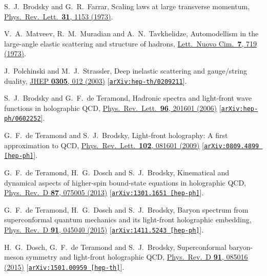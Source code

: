 \documentclass[aps,prd,preprint,groupedaddress]{revtex4-1}
\begin{document}
\begin{thebibliography}{99}
  S.~J.~Brodsky and G.~R.~Farrar,
 Scaling laws at large transverse momentum,
 \href{http://prl.aps.org/abstract/PRL/v31/i18/p1153_1}{ Phys.\ Rev.\ Lett.\  {\bf 31}, 1153 (1973)}.


  V.~A.~Matveev, R.~M.~Muradian and A.~N.~Tavkhelidze,
 Automodellism in the large-angle elastic scattering and structure of hadrons,
  \href{http://www.springerlink.com/content/d272226535833524/}{ Lett.\ Nuovo Cim.\  {\bf 7}, 719 (1973)}.


  J.~Polchinski and M.~J.~Strassler,
  Deep inelastic scattering and gauge/string duality,
  \href{http://iopscience.iop.org/1126-6708/2003/05/012/}{ JHEP {\bf 0305}, 012 (2003)}
  [\href{http://arXiv.org/abs/hepth/0209211}{\tt arXiv:hep-th/0209211}].


  S.~J.~Brodsky and G.~F.~de Teramond,
  Hadronic spectra and light-front wave functions in holographic QCD,
  \href{http://prl.aps.org/abstract/PRL/v96/i20/e201601}{Phys.\ Rev.\ Lett.\  {\bf 96}, 201601 (2006)}
  [\href{http://arXiv.org/abs/hep-ph/0602252}{\tt arXiv:hep-ph/0602252}].


  G.~F.~de Teramond and S.~J.~Brodsky,
  Light-front holography: A first approximation to QCD,
  \href{http://prl.aps.org/abstract/PRL/v102/i8/e081601}{Phys.\ Rev.\ Lett.\  {\bf 102}, 081601 (2009)}
 [\href{http://arXiv.org/abs/0809.4899}{\tt arXiv:0809.4899 [hep-ph]}].


 G.~F.~de Teramond, H.~G.~Dosch and S.~J.~Brodsky,
 Kinematical and dynamical aspects of higher-spin bound-state equations in holographic QCD,
 \href{http://prd.aps.org/abstract/PRD/v87/i7/e075005}{Phys.\ Rev.\ D {\bf 87}, 075005 (2013)}
 [\href{http://arxiv.org/abs/arXiv:1301.1651}{\tt arXiv:1301.1651 [hep-ph]}].


 G.~F.~de Teramond, H.~G.~Dosch and S.~J.~Brodsky,
 Baryon spectrum from superconformal quantum mechanics and its light-front holographic embedding,
 \href{http://journals.aps.org/prd/abstract/17.1103/PhysRevD.91.045040}{Phys.\
 Rev.\ D {\bf 91}, 045040 (2015)}
 [\href{http://arxiv.org/abs/arXiv:1411.5243}{\tt arXiv:1411.5243 [hep-ph]}].


 H.~G.~Dosch, G.~F.~de Teramond and S.~J.~Brodsky,
 Superconformal baryon-meson symmetry and light-front holographic QCD,
 \href{https://journals.aps.org/prd/abstract/17.1103/PhysRevD.91.085016}{Phys.\
 Rev.\ D {\bf 91}, 085016 (2015)}
 [\href{http://arxiv.org/abs/1501.00959}{\tt arXiv:1501.00959 [hep-th]}].



\end{thebibliography}
\end{document}
